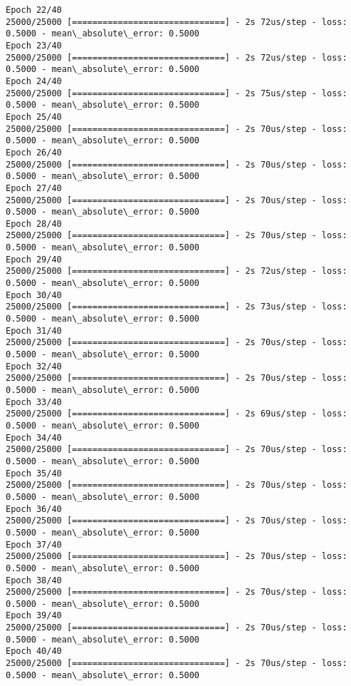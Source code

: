 \documentclass[11pt]{article}
\begin{document}
\begin{Verbatim}[commandchars=\\\{\}]
Epoch 22/40
25000/25000 [==============================] - 2s 72us/step - loss: 0.5000 - mean\_absolute\_error: 0.5000
Epoch 23/40
25000/25000 [==============================] - 2s 72us/step - loss: 0.5000 - mean\_absolute\_error: 0.5000
Epoch 24/40
25000/25000 [==============================] - 2s 75us/step - loss: 0.5000 - mean\_absolute\_error: 0.5000
Epoch 25/40
25000/25000 [==============================] - 2s 70us/step - loss: 0.5000 - mean\_absolute\_error: 0.5000
Epoch 26/40
25000/25000 [==============================] - 2s 70us/step - loss: 0.5000 - mean\_absolute\_error: 0.5000
Epoch 27/40
25000/25000 [==============================] - 2s 70us/step - loss: 0.5000 - mean\_absolute\_error: 0.5000
Epoch 28/40
25000/25000 [==============================] - 2s 70us/step - loss: 0.5000 - mean\_absolute\_error: 0.5000
Epoch 29/40
25000/25000 [==============================] - 2s 72us/step - loss: 0.5000 - mean\_absolute\_error: 0.5000
Epoch 30/40
25000/25000 [==============================] - 2s 73us/step - loss: 0.5000 - mean\_absolute\_error: 0.5000
Epoch 31/40
25000/25000 [==============================] - 2s 70us/step - loss: 0.5000 - mean\_absolute\_error: 0.5000
Epoch 32/40
25000/25000 [==============================] - 2s 70us/step - loss: 0.5000 - mean\_absolute\_error: 0.5000
Epoch 33/40
25000/25000 [==============================] - 2s 69us/step - loss: 0.5000 - mean\_absolute\_error: 0.5000
Epoch 34/40
25000/25000 [==============================] - 2s 70us/step - loss: 0.5000 - mean\_absolute\_error: 0.5000
Epoch 35/40
25000/25000 [==============================] - 2s 70us/step - loss: 0.5000 - mean\_absolute\_error: 0.5000
Epoch 36/40
25000/25000 [==============================] - 2s 70us/step - loss: 0.5000 - mean\_absolute\_error: 0.5000
Epoch 37/40
25000/25000 [==============================] - 2s 70us/step - loss: 0.5000 - mean\_absolute\_error: 0.5000
Epoch 38/40
25000/25000 [==============================] - 2s 70us/step - loss: 0.5000 - mean\_absolute\_error: 0.5000
Epoch 39/40
25000/25000 [==============================] - 2s 70us/step - loss: 0.5000 - mean\_absolute\_error: 0.5000
Epoch 40/40
25000/25000 [==============================] - 2s 70us/step - loss: 0.5000 - mean\_absolute\_error: 0.5000

    \end{Verbatim}
\end{document}
